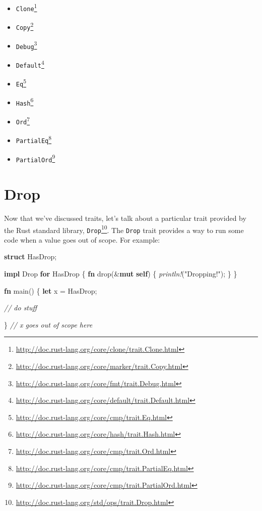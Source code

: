 \documentclass[a4paper,]{book}
\newenvironment{Shaded}{\begin{snugshade}}{\end{snugshade}}
\newcommand{\KeywordTok}[1]{\textcolor[rgb]{0.13,0.29,0.53}{\textbf{{#1}}}}
\newcommand{\StringTok}[1]{\textcolor[rgb]{0.31,0.60,0.02}{{#1}}}
\newcommand{\CommentTok}[1]{\textcolor[rgb]{0.56,0.35,0.01}{\textit{{#1}}}}
\newcommand{\BuiltInTok}[1]{{#1}}
\newcommand{\PreprocessorTok}[1]{\textcolor[rgb]{0.56,0.35,0.01}{\textit{{#1}}}}
\newcommand{\NormalTok}[1]{{#1}}
\renewcommand{\href}[2]{#2\footnote{\url{#1}}}
\providecommand{\tightlist}{%
  \setlength{\itemsep}{0pt}\setlength{\parskip}{0pt}}
\begin{document}
\begin{itemize}
\tightlist
\item
  \href{http://doc.rust-lang.org/core/clone/trait.Clone.html}{\texttt{Clone}}
\item
  \href{http://doc.rust-lang.org/core/marker/trait.Copy.html}{\texttt{Copy}}
\item
  \href{http://doc.rust-lang.org/core/fmt/trait.Debug.html}{\texttt{Debug}}
\item
  \href{http://doc.rust-lang.org/core/default/trait.Default.html}{\texttt{Default}}
\item
  \href{http://doc.rust-lang.org/core/cmp/trait.Eq.html}{\texttt{Eq}}
\item
  \href{http://doc.rust-lang.org/core/hash/trait.Hash.html}{\texttt{Hash}}
\item
  \href{http://doc.rust-lang.org/core/cmp/trait.Ord.html}{\texttt{Ord}}
\item
  \href{http://doc.rust-lang.org/core/cmp/trait.PartialEq.html}{\texttt{PartialEq}}
\item
  \href{http://doc.rust-lang.org/core/cmp/trait.PartialOrd.html}{\texttt{PartialOrd}}
\end{itemize}

\hypertarget{sec--drop}{\section{Drop}\label{sec--drop}}

Now that we've discussed traits, let's talk about a particular trait
provided by the Rust standard library,
\href{http://doc.rust-lang.org/std/ops/trait.Drop.html}{\texttt{Drop}}.
The \texttt{Drop} trait provides a way to run some code when a value
goes out of scope. For example:

\begin{Shaded}
\begin{Highlighting}[]
\KeywordTok{struct} \NormalTok{HasDrop;}

\KeywordTok{impl} \BuiltInTok{Drop} \KeywordTok{for} \NormalTok{HasDrop \{}
    \KeywordTok{fn} \NormalTok{drop(&}\KeywordTok{mut} \KeywordTok{self}\NormalTok{) \{}
        \PreprocessorTok{println!}\NormalTok{(}\StringTok{"Dropping!"}\NormalTok{);}
    \NormalTok{\}}
\NormalTok{\}}

\KeywordTok{fn} \NormalTok{main() \{}
    \KeywordTok{let} \NormalTok{x = HasDrop;}

    \CommentTok{// do stuff}

\NormalTok{\} }\CommentTok{// x goes out of scope here}
\end{Highlighting}
\end{Shaded}
\end{document}
